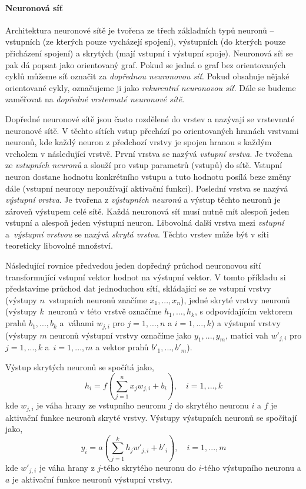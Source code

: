\paragraph{Neuronová síť}
Architektura neuronové sítě je tvořena ze třech základních typů neuronů --
vstupních (ze kterých pouze vycházejí spojení), výstupních (do kterých pouze
přicházení spojení) a skrytých (mají vstupní i výstupní spoje). Neuronová síť
se pak dá popsat jako orientovaný graf. Pokud se jedná o graf bez orientovaných
cyklů můžeme síť označit za \emph{dopřednou neuronovou síť}. Pokud obsahuje
nějaké orientované cykly, označujeme ji jako \emph{rekurentní neuronovou síť}.
Dále se budeme zaměřovat na \emph{dopředné vrstevnaté neuronové sítě}.

Dopředné neuronové sítě jsou často rozdělené do vrstev a nazývají se vrstevnaté
neuronové sítě. V těchto sítích vstup přechází po orientovaných hranách
vrstvami neuronů, kde každý neuron z předchozí vrstvy je spojen hranou s každým
vrcholem v následující vrstvě. První vrstva se nazývá \emph{vstupní vrstva}. Je
tvořena ze \emph{vstupních neuronů} a slouží pro vstup parametrů (vstupů) do
sítě. Vstupní neuron dostane hodnotu konkrétního vstupu a tuto hodnotu posílá
beze změny dále (vstupní neurony nepoužívají aktivační funkci). Poslední vrstva
se nazývá \emph{výstupní vrstva}. Je tvořena z \emph{výstupních neuronů} a
výstup těchto neuronů je zároveň výstupem celé sítě. Každá neuronová síť musí
nutně mít alespoň jeden vstupní a alespoň jeden výstupní neuron. Libovolná
další vrstva mezi \emph{vstupní} a~\emph{výstupní vrstvou} se nazývá
\emph{skrytá vrstva}. Těchto vrstev může být v síti teoreticky libovolné
množství.

Následující rovnice předvedou jeden dopředný průchod neuronovou sítí
transformující vstupní vektor hodnot na výstupní vektor. V tomto příkladu si
představíme průchod dat jednoduchou sítí, skládající se ze vstupní vrstvy
(výstupy $n$~vstupních neuronů značíme $x_1,...,x_n$), jedné skryté vrstvy
neuronů (výstupy $k$~neuronů v této vrstvě označíme $h_1,...,h_k$, s
odpovídajícím vektorem prahů $b_1,...,b_k$ a~váhami $w_{j,i}$ pro $j=1,...,n$ a
$i=1,...,k$) a výstupní vrstvy (výstupy $m$ neuronů výstupní vrstvy označíme
jako $y_1,...,y_m$, matici vah $w'_{j,i}$ pro $j=1,...,k$ a~$i=1,...,m$ a
vektor prahů $b'_1,...,b'_m$).

Výstup skrytých neuronů se spočítá jako,
\begin{equation} \label{eq:hidden}
    h_i = f(\sum_{j=1}^{n} x_j w_{j,i} + b_i), \quad i = 1,...,k
\end{equation}
kde $w_{j,i}$ je váha hrany ze vstupního neuronu $j$ do skrytého neuronu $i$ a
$f$ je aktivační funkce neuronů skryté vrstvy.
Výstupy výstupních neuronů se spočítají jako,
\begin{equation} \label{eq:output}
    y_i = a(\sum_{j=1}^{k} h_j w'_{j,i} + b'_i), \quad i = 1,...,m
\end{equation}
kde $w'_{j,i}$ je váha hrany z $j$-tého skrytého neuronu do $i$-tého výstupního
neuronu a $a$ je aktivační funkce neuronů výstupní vrstvy.

